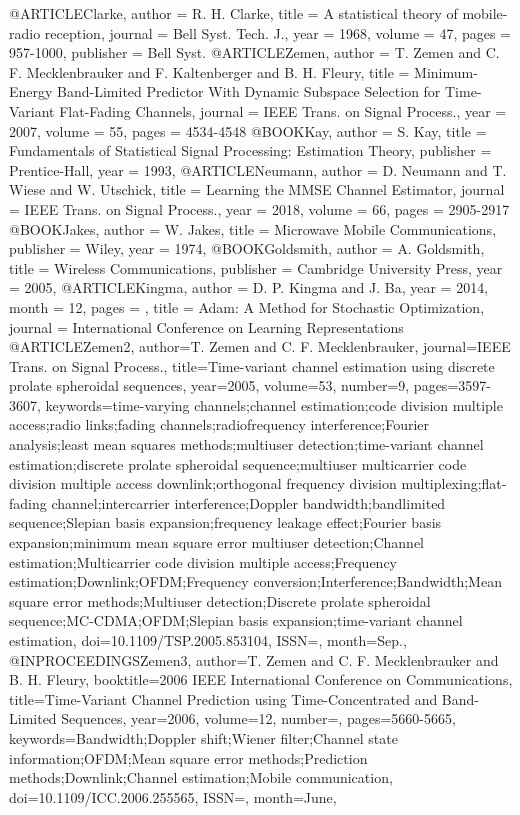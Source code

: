 \documentclass[12pt, draftclsnofoot, onecolumn]{IEEEtran}
\begin{document}

@ARTICLE{Clarke,
  author = {R. H. Clarke},
  title = {A statistical theory of mobile-radio reception},
  journal = {Bell Syst. Tech. J.},
  year = {1968},
  volume = {47},
  pages = {957-1000},
  publisher = {Bell Syst.}
}
@ARTICLE{Zemen,
  author = {T. Zemen and C. F. Mecklenbrauker and F. Kaltenberger and B. H. Fleury},
  title = {Minimum-Energy Band-Limited Predictor With Dynamic Subspace Selection for Time-Variant Flat-Fading Channels},
  journal = {IEEE Trans. on Signal Process.},
  year = {2007},
  volume = {55},
  pages = {4534-4548}
}
@BOOK{Kay,
  author = {S. Kay},
  title = {Fundamentals of Statistical Signal Processing: Estimation Theory},
  publisher = {Prentice-Hall},
  year = {1993},
}
@ARTICLE{Neumann,
  author = {D. Neumann and T. Wiese and W. Utschick},
  title = {Learning the {MMSE} Channel Estimator},
  journal = {IEEE Trans. on Signal Process.},
  year = {2018},
  volume = {66},
  pages = {2905-2917}
}
@BOOK{Jakes,
  author = {W. Jakes},
  title = {Microwave Mobile Communications},
  publisher = {Wiley},
  year = {1974},
}
@BOOK{Goldsmith,
  author = {A. Goldsmith},
  title = {Wireless Communications},
  publisher = {Cambridge University Press},
  year = {2005},
}
@ARTICLE{Kingma,
author = {D. P. Kingma and J. Ba},
year = {2014},
month = {12},
pages = {},
title = {Adam: A Method for Stochastic Optimization},
journal = {International Conference on Learning Representations}
}
@ARTICLE{Zemen2,
author={T. {Zemen} and C. F. {Mecklenbrauker}},
journal={IEEE Trans. on Signal Process.},
title={Time-variant channel estimation using discrete prolate spheroidal sequences},
year={2005},
volume={53},
number={9},
pages={3597-3607},
keywords={time-varying channels;channel estimation;code division multiple access;radio links;fading channels;radiofrequency interference;Fourier analysis;least mean squares methods;multiuser detection;time-variant channel estimation;discrete prolate spheroidal sequence;multiuser multicarrier code division multiple access downlink;orthogonal frequency division multiplexing;flat-fading channel;intercarrier interference;Doppler bandwidth;bandlimited sequence;Slepian basis expansion;frequency leakage effect;Fourier basis expansion;minimum mean square error multiuser detection;Channel estimation;Multicarrier code division multiple access;Frequency estimation;Downlink;OFDM;Frequency conversion;Interference;Bandwidth;Mean square error methods;Multiuser detection;Discrete prolate spheroidal sequence;MC-CDMA;OFDM;Slepian basis expansion;time-variant channel estimation},
doi={10.1109/TSP.2005.853104},
ISSN={},
month={Sep.},
}
@INPROCEEDINGS{Zemen3,
author={T. {Zemen} and C. F. {Mecklenbrauker} and B. H. {Fleury}},
booktitle={2006 IEEE International Conference on Communications},
title={Time-Variant Channel Prediction using Time-Concentrated and Band-Limited Sequences},
year={2006},
volume={12},
number={},
pages={5660-5665},
keywords={Bandwidth;Doppler shift;Wiener filter;Channel state information;OFDM;Mean square error methods;Prediction methods;Downlink;Channel estimation;Mobile communication},
doi={10.1109/ICC.2006.255565},
ISSN={},
month={June},}
\end{document}
